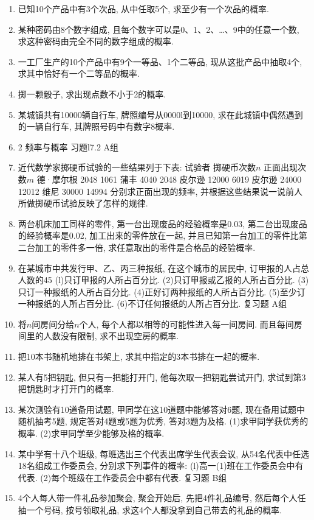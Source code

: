 \documentclass[10pt,a4paper]{article}
\begin{document}
\begin{enumerate}[1.]
\item 已知10个产品中有3个次品, 从中任取5个, 求至少有一个次品的概率.
\item 某种密码由8个数字组成, 且每个数字可以是0、1、2、…、9中的任意一个数, 求这种密码由完全不同的数字组成的概率.
\item 一工厂生产的10个产品中有9个一等品、1个二等品, 现从这批产品中抽取4个, 求其中恰好有一个二等品的概率.
\item 掷一颗骰子, 求出现点数不小于2的概率.
\item 某城镇共有10000辆自行车, 牌照编号从0000l到10000, 求在此城镇中偶然遇到的一辆自行车, 其牌照号码中有数字8概率.
\item 2  频率与概率
习题l7.2 A组
\item 近代数学家掷硬币试验的一些结果列于下表:
试验者	掷硬币次数$n$	正面出现次数$m$
德·摩尔根	2048	1061
蒲丰	4040	2048
皮尔逊	12000	6019
皮尔逊	24000	12012
维尼	30000	14994
分别求正面出现的频率, 并根据这些结果说一说前人所做掷硬币试验反映了怎样的规律.
\item 两台机床加工同样的零件, 第一台出现废品的经验概率是0.03, 第二台出现废品的经验概率是0.02, 加工出来的零件放在一起, 并且已知第一台加工的零件比第二台加工的零件多一倍, 求任意取出的零件是合格品的经验概率.
\item 在某城市中共发行甲、乙、丙三种报纸, 在这个城市的居民中, 订甲报的人占总人数的45%
(l)只订甲报的人所占百分比.
(2)只订甲报或乙报的人所占百分比.
(3)只订一种报纸的人所占百分比.
(4)正好订两种报纸的人所占百分比.
(5)至少订一种报纸的人所占百分比.
(6)不订任何报纸的人所占百分比.
复习题
A组
\item 将$n$间房间分给$n$个人, 每个人都以相等的可能性进入每一间房间. 而且每间房间里的人数没有限制, 求不出现空房的概率.
\item 把10本书随机地排在书架上, 求其中指定的3本书排在一起的概率.
\item 某人有5把钥匙, 但只有一把能打开门, 他每次取一把钥匙尝试开门, 求试到第3把钥匙时才打开门的概率.
\item 某次测验有10道备用试题, 甲同学在这10道题中能够答对6题, 现在备用试题中随机抽考5题, 规定答对4题或5题为优秀, 答对3题为及格.
(1)求甲同学获优秀的概率.
(2)求甲同学至少能够及格的概率.
\item 某中学有十八个班级, 每班选出三个代表出席学生代表会议, 从54名代表中任选18名组成工作委员会, 分别求下列事件的概率:
(l)高一(1)班在工作委员会中有代表.
(2)每个班级在工作委员会中都有代表.
复习题
B组
\item 4个人每人带一件礼品参加聚会, 聚会开始后, 先把4件礼品编号, 然后每个人任抽一个号码, 按号领取礼品, 求这4个人都没拿到自己带去的礼品的概率.

\end{enumerate}
\end{document}

